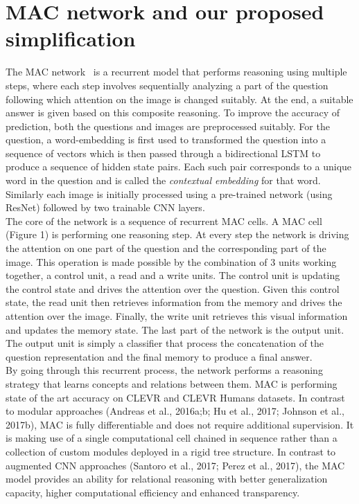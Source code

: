\section{MAC network and our proposed simplification}

The MAC network~\cite{hudsonManning18} is a recurrent model that performs reasoning 
using multiple steps, where each step involves sequentially analyzing a part of the question following which attention on the image is changed suitably.
At the end, a suitable answer is given based on this composite reasoning.
To improve the accuracy of prediction, both the questions and images
are preprocessed suitably. For the question,  a word-embedding is first used to
transformed the question into a sequence of vectors which is then passed through
a bidirectional LSTM to produce a sequence of hidden state pairs. Each such pair 
corresponds to a unique word in the question and is called the 
\emph{contextual embedding} for that word.
Similarly each image is initially processed using a pre-trained network (using ResNet) followed by two trainable CNN layers.\\
The core of the network is a sequence of recurrent MAC cells. A MAC cell (Figure 1) is performing one reasoning step. At every step the network is driving the attention on one part of the question and the corresponding part of the image. This operation is made possible by the combination of 3 units working together, a control unit, a read and a write units. The control unit is updating the control state and drives the attention over the question. Given this control state, the read unit then retrieves information from the memory and drives the attention over the image.
Finally, the write unit retrieves this visual information and updates the memory state.
The last part of the network is the output unit. The output unit is simply a classifier that process the concatenation of the question representation and the final memory to produce a final answer.\\
By going through this recurrent process, the network performs a reasoning strategy that learns concepts and relations between them. MAC is performing state of the art accuracy on CLEVR and CLEVR Humans datasets.
In contrast to modular approaches (Andreas et al., 2016a;b; Hu et al., 2017; Johnson et al., 2017b), MAC is fully
differentiable and does not require additional supervision. It is making use of a single computational cell chained in sequence rather than a collection of custom modules deployed in a rigid tree structure.
In contrast to augmented CNN approaches (Santoro et al., 2017; Perez et al., 2017),  the MAC model provides an ability for relational reasoning with better generalization capacity, higher
computational efficiency and enhanced transparency.



